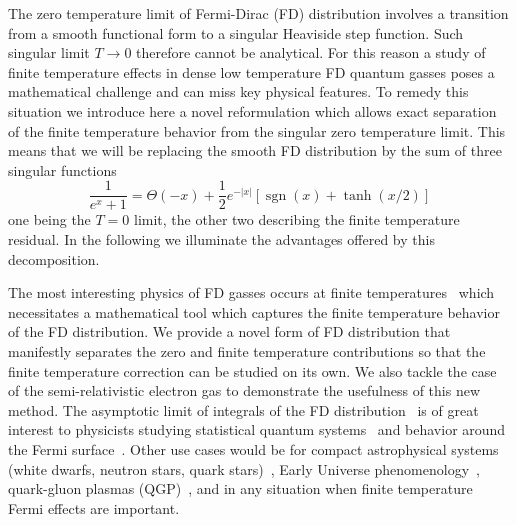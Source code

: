 \documentclass[sn-mathphys,Numbered]{sn-jnl}
\newcommand{\rsec}[1]{Sec.~{\ref{#1}}}
\DeclareMathOperator{\sgn}{sgn}
\begin{document}

The zero temperature limit of Fermi-Dirac (FD) distribution involves a transition from a smooth functional form to a singular Heaviside step function. Such singular limit  $T\to 0$ therefore cannot be analytical. For this reason a study of finite temperature effects in dense low temperature FD quantum gasses poses a mathematical challenge and can miss key physical features. To remedy this situation we introduce here a novel reformulation which allows exact separation of the finite temperature behavior from the singular zero temperature limit. This means that we will be replacing the smooth FD distribution by the sum of three singular functions
$$
\boxed{\frac{1}{e^{x} +1}=\Theta(-x)+\frac{1}{2}e^{-|x|}\left[\sgn(x)+\tanh(x/2)\right]}
$$
one being the $T=0$ limit, the other two describing the finite temperature residual. In the following we illuminate the advantages offered by this decomposition.

The most interesting physics of FD gasses occurs at finite temperatures~\cite{bludman1977equation,Elze:1980er} which necessitates a mathematical tool which captures the finite temperature behavior of the FD distribution. We provide a novel form of FD distribution that manifestly separates the zero and finite temperature contributions so that the finite temperature correction can be studied on its own. We also tackle the case of the semi-relativistic electron gas to demonstrate the usefulness of this new method. The asymptotic limit of integrals of the FD distribution~\cite{dingle1957fermi,dingle1973asymptotic} is of great interest to physicists studying statistical quantum systems~\cite{10.1063/1.1350634,10.1142/S021827180701002X,10.1063/1.1665160,FUKUSHIMA2014417,GIL2022126618,GIL2023108563} and behavior around the Fermi surface~\cite{kim2008notes,PhysRevB.103.205154}. Other use cases would be for compact astrophysical systems (white dwarfs, neutron stars, quark stars)~\cite{Kaspi:2017fwg,Ferrer:2019xlr,Ferrer:2023pgq}, Early Universe phenomenology~\cite{Rafelski:2021aey,Rafelski:2023emw,Grayson:2023flr,Steinmetz:2023nsc}, quark-gluon plasmas (QGP)~\cite{Letessier:2002ony,Rafelski:2020ajx,Yang:2021bko}, and in any situation when finite temperature Fermi effects are important. 

\end{document}
